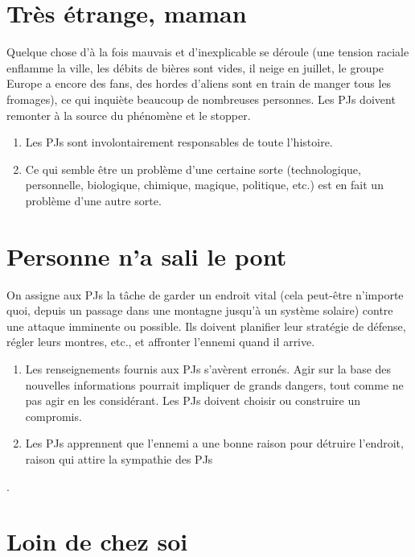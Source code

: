 \begin{multicols}{2}
\section{Très étrange, maman}
\label{etrange}


Quelque chose d'à la fois mauvais et d'inexplicable se déroule (une tension raciale enflamme la ville, les débits de bières sont vides, il neige en juillet, le groupe Europe a encore des fans, des hordes d'aliens sont en train de manger tous les fromages), ce qui inquiète beaucoup de nombreuses personnes. Les PJs doivent remonter à la source du phénomène et le stopper.

\themes
\begin{enumerate}
\item Les PJs sont involontairement responsables de toute l'histoire.
\item Ce qui semble être un problème d'une certaine sorte (technologique, personnelle, biologique, chimique, magique, politique, etc.) est en fait un problème d'une autre sorte.
\end{enumerate}

\section{Personne n'a sali le pont}
\label{pont}


On assigne aux PJs la tâche de garder un endroit vital (cela peut-être n'importe quoi, depuis un passage dans une montagne jusqu'à un système solaire) contre une attaque imminente ou possible. Ils doivent planifier leur stratégie de défense, régler leurs montres, etc., et affronter l'ennemi quand il arrive.

\themes
\begin{enumerate}
\item Les renseignements fournis aux PJs s'avèrent erronés. Agir sur la base des nouvelles informations pourrait impliquer de grands dangers, tout comme ne pas agir en les considérant. Les PJs doivent choisir ou construire un compromis.
\item Les PJs apprennent que l'ennemi a une bonne raison pour détruire l'endroit, raison qui attire la sympathie des PJs
\end{enumerate}.

\section{Loin de chez soi}
\label{loin}


\end{multicols}
